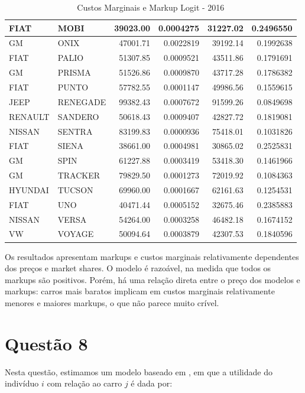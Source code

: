 \documentclass{article}
\begin{document}
\begin{table}[H]
\begin{tabular}{l|l|r|r|r|r}
\hline
FIAT & MOBI & 39023.00 & 0.0004275 & 31227.02 & 0.2496550\\
\hline
GM & ONIX & 47001.71 & 0.0022819 & 39192.14 & 0.1992638\\
\hline
FIAT & PALIO & 51307.85 & 0.0009521 & 43511.86 & 0.1791691\\
\hline
GM & PRISMA & 51526.86 & 0.0009870 & 43717.28 & 0.1786382\\
\hline
FIAT & PUNTO & 57782.55 & 0.0001147 & 49986.56 & 0.1559615\\
\hline
JEEP & RENEGADE & 99382.43 & 0.0007672 & 91599.26 & 0.0849698\\
\hline
RENAULT & SANDERO & 50618.43 & 0.0009407 & 42827.72 & 0.1819081\\
\hline
NISSAN & SENTRA & 83199.83 & 0.0000936 & 75418.01 & 0.1031826\\
\hline
FIAT & SIENA & 38661.00 & 0.0004981 & 30865.02 & 0.2525831\\
\hline
GM & SPIN & 61227.88 & 0.0003419 & 53418.30 & 0.1461966\\
\hline
GM & TRACKER & 79829.50 & 0.0001273 & 72019.92 & 0.1084363\\
\hline
HYUNDAI & TUCSON & 69960.00 & 0.0001667 & 62161.63 & 0.1254531\\
\hline
FIAT & UNO & 40471.44 & 0.0005152 & 32675.46 & 0.2385883\\
\hline
NISSAN & VERSA & 54264.00 & 0.0003258 & 46482.18 & 0.1674152\\
\hline
VW & VOYAGE & 50094.64 & 0.0003879 & 42307.53 & 0.1840596\\
\hline
\end{tabular}
    \caption{Custos Marginais e Markup Logit - 2016}
    \label{tab:custologit}
\end{table}

Os resultados apresentam markups e custos marginais relativamente dependentes dos preços e market shares. O modelo é razoável, na medida que todos os markups são positivos. Porém, há uma relação direta entre o preço dos modelos e markups: carros mais baratos implicam em custos marginais relativamente menores e maiores markups, o que não parece muito crível.

\section*{Questão 8}

Nesta questão, estimamos um modelo baseado em , em que a utilidade do indivíduo $i$ com relação ao carro $j$ é dada por:
\end{document}
